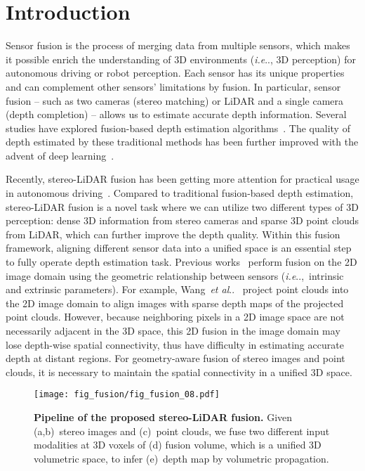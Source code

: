 \documentclass[letterpaper, 10 pt, conference]{ieeeconf}
\makeatletter
\DeclareRobustCommand\onedot{\futurelet\@let@token\@onedot}
\def\@onedot{\ifx\@let@token.\else.\null\fi\xspace}
\def\ie{\emph{i.e}\onedot} \def\Ie{{I.e}\onedot}
\def\etal{\emph{et al}\onedot}
\makeatother
\begin{document}
\section{Introduction}
\label{sec:Introduction}
Sensor fusion is the process of merging data from multiple sensors, which makes it possible enrich the understanding of 3D environments (\ie, 3D perception) for autonomous driving or robot perception. Each sensor has its unique properties and can complement other sensors' limitations by fusion. In particular, sensor fusion -- such as two cameras (stereo matching) or LiDAR and a single camera (depth completion) -- allows us to estimate accurate depth information. Several studies have explored fusion-based depth estimation algorithms~\cite{geometry,semi_global_matching,displets}. The quality of depth estimated by these traditional methods has been further improved with the advent of deep learning~\cite{dispnet,gcnet,sparse-to-dense,guidenet,stereo_object,seg2reg}. 

Recently, stereo-LiDAR fusion has been getting more attention for practical usage in autonomous driving~\cite{stereolidar_norm_costV_ccvn,stereolidar_00,stereolidar_01}. Compared to traditional fusion-based depth estimation, stereo-LiDAR fusion is a novel task where we can utilize two different types of 3D perception: dense 3D information from stereo cameras and sparse 3D point clouds from LiDAR, which can further improve the depth quality. Within this fusion framework, aligning different sensor data into a unified space is an essential step to fully operate depth estimation task. Previous works~\cite{stereolidar_norm_costV_ccvn,stereolidar_00,stereolidar_01} perform fusion on the 2D image domain using the geometric relationship between sensors (\ie,~intrinsic and extrinsic parameters). For example, Wang~\etal~\cite{stereolidar_norm_costV_ccvn} project point clouds into the 2D image domain to align images with sparse depth maps of the projected point clouds. 
However, because neighboring pixels in a 2D image space are not necessarily adjacent in the 3D space, this 2D fusion in the image domain may lose depth-wise spatial connectivity, thus have difficulty in estimating accurate depth at distant regions.
For geometry-aware fusion of stereo images and point clouds, it is necessary to maintain the spatial connectivity in a unified 3D space.


\begin{figure}[!t]
    \centering
    \texttt{[image: fig\_fusion/fig\_fusion\_08.pdf]}
    \vspace{-7mm}
    \caption{\textbf{Pipeline of the proposed stereo-LiDAR fusion.} 
    Given (a,b)~stereo images and (c)~point clouds, we fuse two different input modalities at 3D voxels of (d) fusion volume, which is a unified 3D volumetric space, to infer (e)~depth map by volumetric propagation. }
    \vspace{-4mm}
    \label{fig:fig_intro}
\end{figure}
\end{document}
